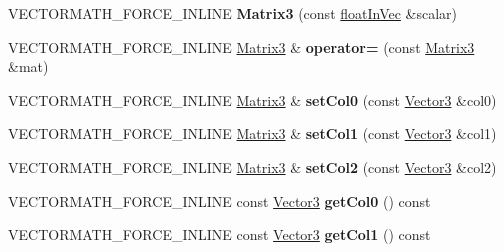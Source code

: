 \begin{DoxyCompactItemize}
V\+E\+C\+T\+O\+R\+M\+A\+T\+H\+\_\+\+F\+O\+R\+C\+E\+\_\+\+I\+N\+L\+I\+NE {\bfseries Matrix3} (const \hyperlink{classVectormath_1_1floatInVec}{float\+In\+Vec} \&scalar)
\item 
\mbox{\label{classVectormath_1_1Aos_1_1Matrix3_a80b68acbbba9f8e8e296cae38a53c35b}} 
V\+E\+C\+T\+O\+R\+M\+A\+T\+H\+\_\+\+F\+O\+R\+C\+E\+\_\+\+I\+N\+L\+I\+NE \hyperlink{classVectormath_1_1Aos_1_1Matrix3}{Matrix3} \& {\bfseries operator=} (const \hyperlink{classVectormath_1_1Aos_1_1Matrix3}{Matrix3} \&mat)
\item 
\mbox{\label{classVectormath_1_1Aos_1_1Matrix3_a8f8fd6b2d5206c0e8f0a245ad9c81a20}} 
V\+E\+C\+T\+O\+R\+M\+A\+T\+H\+\_\+\+F\+O\+R\+C\+E\+\_\+\+I\+N\+L\+I\+NE \hyperlink{classVectormath_1_1Aos_1_1Matrix3}{Matrix3} \& {\bfseries set\+Col0} (const \hyperlink{classVectormath_1_1Aos_1_1Vector3}{Vector3} \&col0)
\item 
\mbox{\label{classVectormath_1_1Aos_1_1Matrix3_a456edc290d244d17dcddd23e241e9acd}} 
V\+E\+C\+T\+O\+R\+M\+A\+T\+H\+\_\+\+F\+O\+R\+C\+E\+\_\+\+I\+N\+L\+I\+NE \hyperlink{classVectormath_1_1Aos_1_1Matrix3}{Matrix3} \& {\bfseries set\+Col1} (const \hyperlink{classVectormath_1_1Aos_1_1Vector3}{Vector3} \&col1)
\item 
\mbox{\label{classVectormath_1_1Aos_1_1Matrix3_ad821271f4f936c43be5d41c1ab7f480f}} 
V\+E\+C\+T\+O\+R\+M\+A\+T\+H\+\_\+\+F\+O\+R\+C\+E\+\_\+\+I\+N\+L\+I\+NE \hyperlink{classVectormath_1_1Aos_1_1Matrix3}{Matrix3} \& {\bfseries set\+Col2} (const \hyperlink{classVectormath_1_1Aos_1_1Vector3}{Vector3} \&col2)
\item 
\mbox{\label{classVectormath_1_1Aos_1_1Matrix3_a2cffaeea843f1a1bd5f1225addc02f53}} 
V\+E\+C\+T\+O\+R\+M\+A\+T\+H\+\_\+\+F\+O\+R\+C\+E\+\_\+\+I\+N\+L\+I\+NE const \hyperlink{classVectormath_1_1Aos_1_1Vector3}{Vector3} {\bfseries get\+Col0} () const
\item 
\mbox{\label{classVectormath_1_1Aos_1_1Matrix3_a9dab7348aafbf7b84a7a65da583a89ef}} 
V\+E\+C\+T\+O\+R\+M\+A\+T\+H\+\_\+\+F\+O\+R\+C\+E\+\_\+\+I\+N\+L\+I\+NE const \hyperlink{classVectormath_1_1Aos_1_1Vector3}{Vector3} {\bfseries get\+Col1} () const

\end{DoxyCompactItemize}
